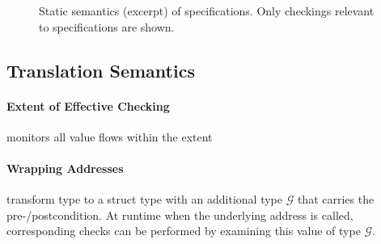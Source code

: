 \begin{figure}[t]




  \caption{Static semantics (excerpt) of \corelang specifications. Only checkings relevant to specifications are shown.}
  \label{fig:static}
\end{figure}


\subsection{Translation Semantics}


\paragraph{Extent of Effective Checking}
monitors all value flows within the extent

\paragraph{Wrapping Addresses} \lang transform  type to a struct
type with an additional type $\mathcal{G}$ that carries the pre-/postcondition.
At runtime when the underlying address is called,
corresponding checks can be performed by examining this value of type $\mathcal{G}$.

